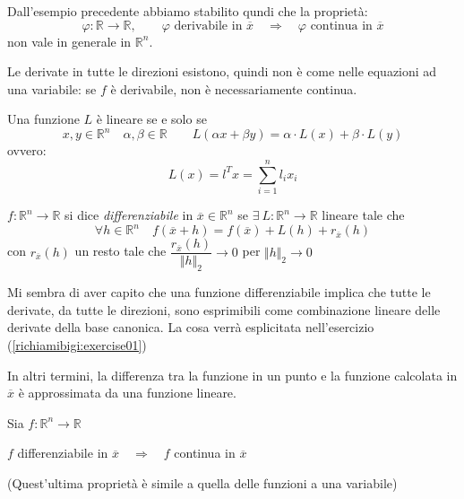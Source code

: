 Dall'esempio precedente abbiamo stabilito qundi che la propriet\`a:
$$ 
\varphi: \mathbb{R} \rightarrow \mathbb{R},  \qquad 
\varphi \text{ derivabile in } \overline{x}
\quad
\Longrightarrow
\quad
\varphi \text{ continua in } \overline{x}
$$
non vale in generale in $\mathbb{R}^{n}$.

\begin{notes}
Le derivate in tutte le direzioni esistono, quindi non è come nelle
equazioni ad una variabile: se $f$ è derivabile, non è 
necessariamente continua.
\end{notes}


\begin{defn}
Una funzione $L$ è lineare se e solo se
$$
x,y \in \mathbb{R}^n  \quad  \alpha,  \beta \in \mathbb{R}
\qquad L(\alpha x + \beta y) = \alpha \cdot L(x) + \beta \cdot L(y) 
$$
ovvero:
$$
L(x) = l^T x = \sum_{i=1}^{n}l_i x_i
$$
\end{defn}

\begin{defn}
$f: \mathbb{R}^n \to \mathbb{R}$ si dice \emph{differenziabile} 
in $\overline{x} \in \mathbb{R}^n$ se $\exists ~ L: \mathbb{R}^n \to \mathbb{R}$
lineare tale che
$$\forall h \in \mathbb{R}^n 
\quad 
 f(\overline{x}+h)=f(\overline{x}) + L(h) + r_{\overline{x}}(h)$$
con $r_{\overline{x}}(h)$ un resto tale che  $\dfrac{r_{\overline{x}}(h)}{\Vert h\Vert_2} \to 0 $ per  $ \Vert h\Vert_2 \to 0$
\end{defn}

\begin{openquestion}
 Mi sembra di aver capito che una funzione differenziabile
implica che tutte le derivate, da tutte le direzioni, sono
esprimibili come combinazione lineare delle derivate della
base canonica. La cosa verr\`a esplicitata nell'esercizio
(\ref{richiamibigi:exercise01})
\end{openquestion}
In altri termini, la differenza tra la funzione in un punto e la
funzione calcolata in $\overline{x}$ è approssimata da una funzione lineare.

\begin{property}
Sia $f:\mathbb{R}^n \rightarrow \mathbb{R}$

$f$ differenziabile in $\overline{x} \quad \Longrightarrow \quad f$
 continua in $\overline{x}$
\end{property}
 
\begin{notes}
(Quest'ultima proprietà è simile a quella delle funzioni a una variabile)  
\end{notes}


